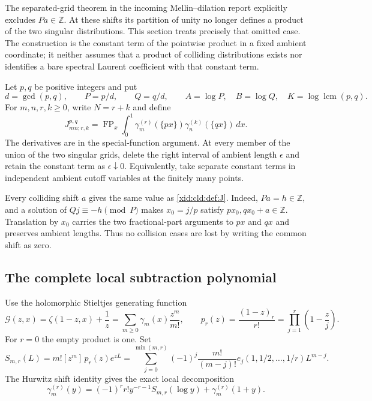 \documentclass[11pt,a4paper]{article}
\numberwithin{equation}{section}
\theoremstyle{definition}
\theoremstyle{remark}
\begin{document}
The separated-grid theorem in the incoming Mellin--dilation report
\cite{IncomingMellin}
explicitly excludes $Pa\in\mathbb Z$.  At these shifts its partition of
unity no longer defines a product of the two singular distributions.
This section treats precisely that omitted case.  The construction is
the constant term of the pointwise product in a fixed ambient coordinate;
it neither assumes that a product of colliding distributions exists nor
identifies a bare spectral Laurent coefficient with that constant term.

Let $p,q$ be positive integers and put
\[
 d=\gcd(p,q),\qquad P=p/d,\qquad Q=q/d,\qquad
 A=\log P,\quad B=\log Q,\quad
 K=\log\operatorname{lcm}(p,q).
\]
For $m,n,r,k\ge0$, write $N=r+k$ and define
\begin{equation}
 J_{mn;r,k}^{p,q}
 =\operatorname{FP}_x\int_0^1
       \gamma_m^{(r)}(\{px\})\gamma_n^{(k)}(\{qx\})\,dx.
 \label{xid:cld:def:J}
\end{equation}
The derivatives are in the special-function argument.  At every member
of the union of the two singular grids, delete the right interval of
ambient length $\epsilon$ and retain the constant term as
$\epsilon\downarrow0$.  Equivalently, take separate constant terms in
independent ambient cutoff variables at the finitely many points.

Every colliding shift $a$ gives the same value as \eqref{xid:cld:def:J}.
Indeed, $Pa=h\in\mathbb Z$, and a solution of
$Qj\equiv-h\pmod P$ makes $x_0=j/p$ satisfy
$px_0,qx_0+a\in\mathbb Z$.  Translation by $x_0$ carries the two
fractional-part arguments to $px$ and $qx$ and preserves ambient lengths.
Thus no collision cases are lost by writing the common shift as zero.

\subsection{The complete local subtraction polynomial}

Use the holomorphic Stieltjes generating function
\[
 \mathscr G(z,x)=\zeta(1-z,x)+\frac1z
       =\sum_{m\ge0}\gamma_m(x)\frac{z^m}{m!},
 \qquad
 p_r(z)=\frac{(1-z)_r}{r!}
       =\prod_{j=1}^r\left(1-\frac zj\right).
\]
For $r=0$ the empty product is one.  Set
\begin{equation}
 S_{m,r}(L)=m![z^m]\,p_r(z)e^{zL}
 =\sum_{j=0}^{\min(m,r)}(-1)^j\frac{m!}{(m-j)!}
     e_j(1,1/2,\ldots,1/r)L^{m-j}.
 \label{xid:cld:S-polynomial}
\end{equation}
The Hurwitz shift identity gives the exact local decomposition
\begin{equation}
 \gamma_m^{(r)}(y)
 =(-1)^r r!y^{-r-1}S_{m,r}(\log y)
      +\gamma_m^{(r)}(1+y).
 \label{xid:cld:local-decomposition}
\end{equation}
\end{document}
